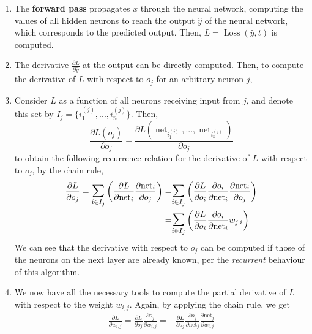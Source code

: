 \documentclass[nobib]{tufte-handout} %
\DeclareMathOperator{\net}{net}
\begin{document}
  \begin{enumerate}
    \item The \textbf{forward pass} propagates $x$ through the neural network, computing the values of all hidden neurons to reach the output $\hat y$ of the neural network, which corresponds to the predicted output. Then, $L = \operatorname{Loss}(\hat y, t)$  is computed.
    \item The derivative $\frac{\partial {L}}{\partial {\hat y}}$ at the output can be directly computed. Then, to compute the derivative of $L$ with respect to $o_j$ for an arbitrary neuron $j$, 

    \item Consider $L$ as a function of all neurons receiving input from $j$, and denote this set by $I_j =\{ i_1^{(j)}, ..., i_n^{(j)}\}$. Then, 
    $$\frac{\partial {L(o_j)}}{\partial {o_j}} = \frac{\partial {L(\net_{i_1^{(j)}}, ..., \net_{i_n^{(j)}})}}{\partial {o_j}} {} $$
    to obtain the following recurrence relation for the derivative of $L$ with respect to $o_j$, by the chain rule, 
    \begin{equation}\label{deriv_o_j}
      \begin{split}
        \frac{\partial {L}}{\partial {o_j}} = \mathlarger{\mathlarger{\sum}}^{}_{i \in I_j} \left( \frac{\partial {L}}{\partial {\net_i}} \frac{\partial {\net_i}}{\partial {o_j}}  \right)  =&  \mathlarger{\mathlarger{\sum}}^{}_{i \in I_j} \left( \frac{\partial {L}}{\partial {o_i}} \frac{\partial {o_i}}{\partial {\net_i}} \frac{\partial {\net_i }}{\partial {o_j}} \right) \\ =&\mathlarger{\mathlarger{\sum}}^{}_{i \in I_j} \left( \frac{\partial {L}}{\partial {o_i}} \frac{\partial {o_i}}{\partial {\net_i}} w_{j,i}\right) 
      \end{split}
    \end{equation}
    We can see that the derivative with respect to $o_j$ can be computed if those of the neurons on the next layer are already known, per the \textit{recurrent} behaviour of this algorithm. 
    \item We now have all the necessary tools to compute the partial derivative of $L$ with respect to the weight $w_{i,j}$. Again, by applying the chain rule, we get
    \begin{equation}\label{deriv_w}
  \begin{split}
    {\frac {\partial L}{\partial w_{i,j}}}={\frac {\partial L}{\partial o_{j}}}{\frac {\partial o_{j}}{\partial w_{i,j}}}=&{\frac {\partial L}{\partial o_{j}}}{\frac {\partial o_{j}}{\partial {\text{net}}_{j}}}{\frac {\partial {\text{net}}_{j}}{\partial w_{i,j}}}\\ 

\end{split}
\end{equation}
\end{enumerate}
\end{document}

